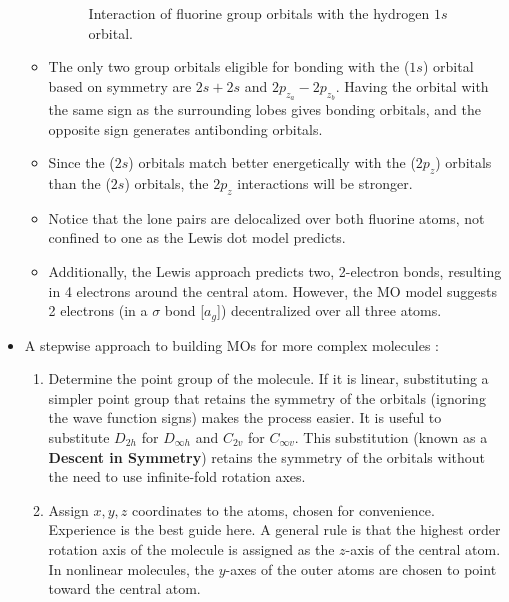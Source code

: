 \documentclass[../notes.tex]{subfiles}
\begin{document}
\begin{itemize}
\begin{itemize}
\begin{figure}[h!]
            \caption{Interaction of fluorine group orbitals with the hydrogen $1s$ orbital.}
            \label{fig:orbitals-FHF}
        \end{figure}
        \item The only two group orbitals eligible for bonding with the ($1s$) orbital based on symmetry are $2s+2s$ and $2p_{z_a}-2p_{z_b}$. Having the  orbital with the same sign as the surrounding lobes gives bonding orbitals, and the opposite sign generates antibonding orbitals.
        \item Since the ($2s$) orbitals match better energetically with the ($2p_z$) orbitals than the ($2s$) orbitals, the $2p_z$ interactions will be stronger.
        \item Notice that the lone pairs are delocalized over both fluorine atoms, not confined to one as the Lewis dot model predicts.
        \item Additionally, the Lewis approach predicts two, 2-electron bonds, resulting in 4 electrons around the central  atom. However, the MO model suggests 2 electrons (in a $\sigma$ bond [$a_g$]) decentralized over all three atoms.
    \end{itemize}
    \item A stepwise approach to building MOs for more complex molecules \parencite[143]{bib:MiesslerFischerTarr}:
    \begin{enumerate}
        \item Determine the point group of the molecule. If it is linear, substituting a simpler point group that retains the symmetry of the orbitals (ignoring the wave function signs) makes the process easier. It is useful to substitute $D_{2h}$ for $D_{\infty h}$ and $C_{2v}$ for $C_{\infty v}$. This substitution (known as a \textbf{Descent in Symmetry}) retains the symmetry of the orbitals without the need to use infinite-fold rotation axes.
        \item Assign $x,y,z$ coordinates to the atoms, chosen for convenience. Experience is the best guide here. A general rule is that the highest order rotation axis of the molecule is assigned as the $z$-axis of the central atom. In nonlinear molecules, the $y$-axes of the outer atoms are chosen to point toward the central atom.

\end{enumerate}
\end{itemize}
\end{document}
